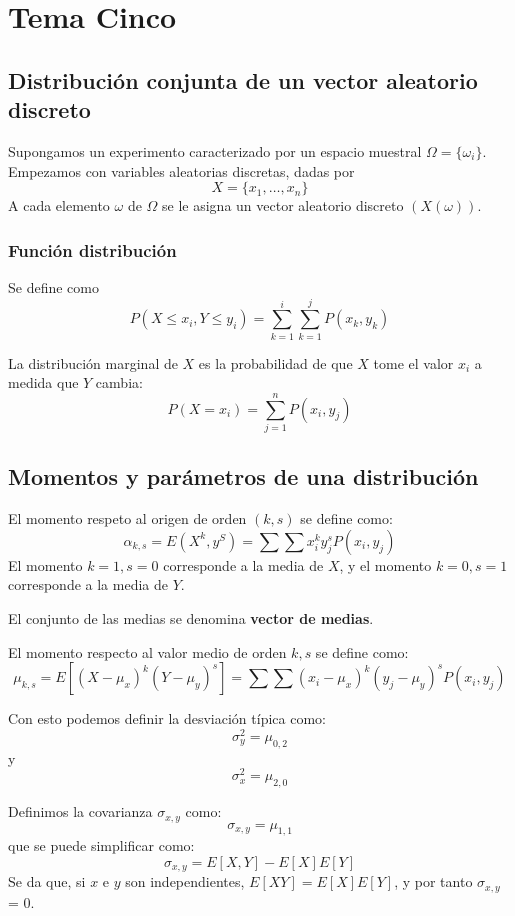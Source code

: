 \documentclass{./Probabilidad.tex}
\begin{document}
\chapter{Tema Cinco}
\section{Distribución conjunta de un vector aleatorio discreto}
Supongamos un experimento caracterizado por un espacio muestral $\Omega = \{ \omega_{i} \}$. Empezamos con variables aleatorias discretas, dadas por 
\[
	X = \{ x_1,\dots ,x_{n} \}
\]
A cada elemento $\omega$ de $\Omega$ se le asigna un vector aleatorio discreto $(X(\omega))$.
\subsection{Función distribución}
Se define como
\[
	P(X \leq x_{i}, Y \leq y_{i}) = \sum^{i}_{k=1}\sum^{j}_{k=1} P(x_{k}, y_{k})
\]
\begin{defin}
	La distribución marginal de $X$ es la probabilidad de que $X$ tome el valor $x_{i}$ a medida que $Y$ cambia:
	\[
		P(X=x_{i}) = \sum_{j=1}^{n} P(x_{i}, y_{j})
	\]
\end{defin}
\section{Momentos y parámetros de una distribución}
\begin{defin}
El momento respeto al origen de orden $(k,s)$ se define como:
\[
 \alpha_{k,s} = E(X^{k}, y^{S}) = \sum \sum x^{k}_{i} y^{s}_{j}P(x_{i}, y_{j})
\]
El momento $k=1, s=0$ corresponde a la media de $X$, y el momento $k=0, s=1$ corresponde a la media de $Y$.

\end{defin}
El conjunto de las medias se denomina \textbf{vector de medias}.
\begin{defin}
El momento respecto al valor medio de orden $k,s$ se define como:
\[
  \mu_{k,s} = E[(X-\mu_{x})^{k}(Y-\mu_{y})^{s}]= \sum \sum (x_{i}-\mu_{x})^{k}(y_{j}-\mu_{y})^{s}P(x_{i},y_{j})
\]
\end{defin}
Con esto podemos definir la desviación típica como:
\[
 \sigma_{ y} ^{2} = \mu_{0,2} 
\]
y
\[
 \sigma_{x} ^{2} = \mu_{2,0} 
\]
\begin{defin}
Definimos la covarianza $\sigma_{x,y}$ como:
\[
  \sigma_{x,y} = \mu_{1,1}
\]
que se puede simplificar como:
\[
  \sigma_{x,y} = E[X,Y] - E[X]E[Y] 
\]
Se da que, si $x$ e $y$ son independientes, $E[XY] = E[X]E[Y]$, y por tanto $\sigma_{x,y}$ = 0.   
\end{defin}
\end{document}
